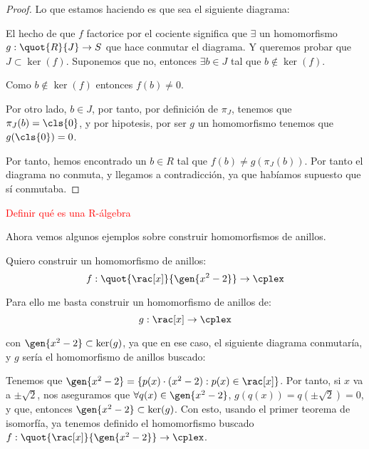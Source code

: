 \begin{proof}
	Lo que estamos haciendo es que sea el siguiente diagrama:

\begin{center}
\end{center}

El hecho de que $f$ factorice por el cociente significa que $\exists$ un homomorfismo $g: \quot{R}{J}\rightarrow S$ que hace conmutar el diagrama. Y queremos probar que $J \subset \ker (f)$. Suponemos que no, entonces $\exists b \in J$ tal que $b \notin \ker (f)$.

Como $b \notin \ker (f)$ entonces $f(b) \neq 0$.

Por otro lado, $b \in J$, por tanto, por definición de $\pi_J$, tenemos que $\pi_J(b)=\cls{0}$, y por hipotesis, por ser $g$ un homomorfismo tenemos que $g(\cls{0})=0$.

Por tanto, hemos encontrado un $b \in R$ tal que $f(b)\neq g(\pi_J(b))$. Por tanto el diagrama no conmuta, y llegamos a contradicción, ya que habíamos supuesto que sí conmutaba.
\end{proof}

\textcolor{red}{Definir qué es una R-álgebra}

Ahora vemos algunos ejemplos sobre construir homomorfismos de anillos.
\begin{example}
Quiero construir un homomorfismo de anillos:
$$f: \quot{\rac[x]}{\gen{x^2-2}} \rightarrow \cplex$$

Para ello me basta construir un homomorfismo de anillos de:
$$g: \rac[x] \rightarrow \cplex$$

con $\gen{x^2-2} \subset \ker (g)$, ya que en ese caso, el siguiente diagrama conmutaría, y $g$ sería el homomorfismo de anillos buscado:


Tenemos que $\gen{x^2-2}=\{ p(x)\cdot(x^2-2):p(x) \in \rac[x] \}$. Por tanto, si $x$ va a $\pm \sqrt{2}$, nos aseguramos que $\forall q(x) \in \gen{x^2-2}$, $g(q(x))=q(\pm \sqrt{2})=0$, y que, entonces $ \gen{x^2-2} \subset \ker (g)$. Con esto, usando el primer teorema de isomorfía, ya tenemos definido el homomorfismo buscado $f: \quot{\rac[x]}{\gen{x^2-2}} \rightarrow \cplex$.
\end{example}

